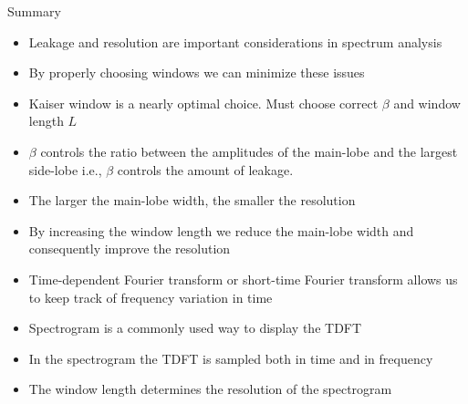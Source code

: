 \documentclass[10pt]{beamer}
\begin{document}
\begin{frame}{Summary}
\begin{itemize}
	\item Leakage and resolution are important considerations in spectrum analysis
	\item By properly choosing windows we can minimize these issues
	\item Kaiser window is a nearly optimal choice. Must choose correct $\beta$ and window length $L$
	\item $\beta$ controls the ratio between the amplitudes of the main-lobe and the largest side-lobe i.e., $\beta$ controls the amount of leakage.
	\item The larger the main-lobe width, the smaller the resolution
	\item By increasing the window length we reduce the main-lobe width and consequently improve the resolution
	\item Time-dependent Fourier transform or short-time Fourier transform allows us to keep track of frequency variation in time
	\item Spectrogram is a commonly used way to display the TDFT
	\item In the spectrogram the TDFT is sampled both in time and in frequency
	\item The window length determines the resolution of the spectrogram
\end{itemize}
\end{frame}
\end{document}
